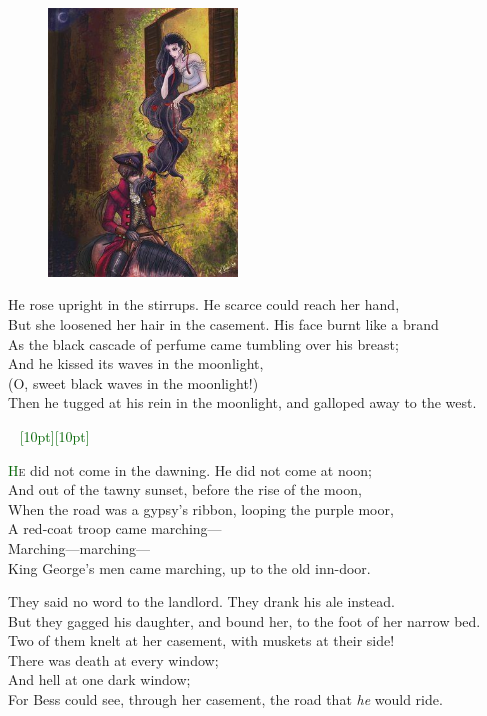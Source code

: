 \documentclass[oneside,12pt,english]{book}
\newcommand*\initfamily{\usefont{U}{Acorn}{xl}{n}}
\newcommand{\ornamento}{\vspace{2em}\noindent \textcolor{darkgreen}{\hrulefill~ \raisebox{-2.5pt}[10pt][10pt]{\leafright \decofourleft \decothreeleft  \aldineright \decotwo \floweroneleft \decoone   \floweroneright \decotwo \aldineleft\decothreeright \decofourright \leafleft} ~  \hrulefill \\ \vspace{2em}}}
\begin{document}
\begin{figure}[H]
\centering
\includegraphics[height=2.8in]{fig-03.jpg}
\end{figure}

He rose upright in the stirrups. He scarce could reach her hand,\\
But she loosened her hair in the casement. His face burnt like a brand\\
As the black cascade of perfume came tumbling over his breast;\\
And he kissed its waves in the moonlight,\\
(O, sweet black waves in the moonlight!)\\
Then he tugged at his rein in the moonlight, and galloped away to the west.

\ornamento
\pagebreak


\lettrine[lines=3]{\initfamily\textcolor{darkgreen}{H}}{e} did not come in the
dawning. He did not come at noon;\\
And out of the tawny sunset, before the rise of the moon,\\
When the road was a gypsy’s ribbon, looping the purple moor,\\
A red-coat troop came marching---\\
Marching---marching---\\
King George’s men came marching, up to the old inn-door.


They said no word to the landlord. They drank his ale instead.\\
But they gagged his daughter, and bound her, to the foot of her narrow bed.\\
Two of them knelt at her casement, with muskets at their side!\\
There was death at every window;\\
And hell at one dark window;\\
For Bess could see, through her casement, the road that \textit{he} would ride.
\end{document}
